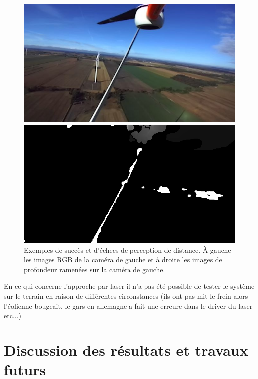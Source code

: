 \begin{figure}[htp]
\begin{minipage}{0.49\textwidth}
  \end{minipage}
  \begin{minipage}{0.49\textwidth}
    \centering
    \includegraphics[width=\linewidth]{images/field_stereo_success_rgb2.png}
  \end{minipage}
  \begin{minipage}{0.49\textwidth}
    \centering
    \includegraphics[width=\linewidth]{images/field_stereo_success_pcl2.png}
  \end{minipage}
  \caption{Exemples de succès et d'échecs de perception de distance. À gauche les images RGB de la caméra de gauche et à droite les images de profondeur ramenées sur la caméra de gauche.}
  \label{fig:field_stereo_fail}
\end{figure}

\color{red}
En ce qui concerne l'approche par laser il n'a pas été possible de tester le système sur le terrain en raison de différentes circonstances (ils ont pas mit le frein alors l'éolienne bougeait, le gars en allemagne a fait une erreure dans le driver du laser etc...)
\color{black}

\section{Discussion des résultats et travaux futurs}
